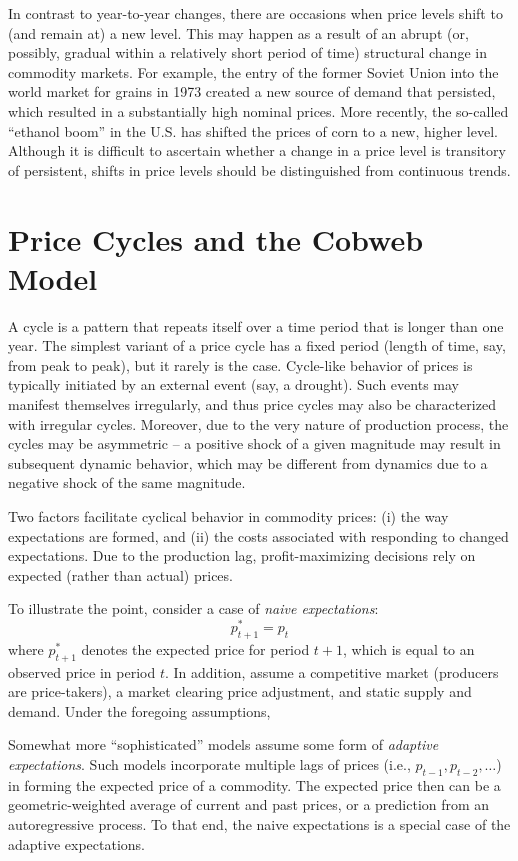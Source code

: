 \documentclass[]{book}
\begin{document}
In contrast to year-to-year changes, there are occasions when price
levels shift to (and remain at) a new level. This may happen as a result
of an abrupt (or, possibly, gradual within a relatively short period of
time) structural change in commodity markets. For example, the entry of
the former Soviet Union into the world market for grains in 1973 created
a new source of demand that persisted, which resulted in a substantially
high nominal prices. More recently, the so-called ``ethanol boom'' in
the U.S. has shifted the prices of corn to a new, higher level. Although
it is difficult to ascertain whether a change in a price level is
transitory of persistent, shifts in price levels should be distinguished
from continuous trends.

\section{Price Cycles and the Cobweb
Model}\label{price-cycles-and-the-cobweb-model}

A cycle is a pattern that repeats itself over a time period that is
longer than one year. The simplest variant of a price cycle has a fixed
period (length of time, say, from peak to peak), but it rarely is the
case. Cycle-like behavior of prices is typically initiated by an
external event (say, a drought). Such events may manifest themselves
irregularly, and thus price cycles may also be characterized with
irregular cycles. Moreover, due to the very nature of production
process, the cycles may be asymmetric -- a positive shock of a given
magnitude may result in subsequent dynamic behavior, which may be
different from dynamics due to a negative shock of the same magnitude.

Two factors facilitate cyclical behavior in commodity prices: (i) the
way expectations are formed, and (ii) the costs associated with
responding to changed expectations. Due to the production lag,
profit-maximizing decisions rely on expected (rather than actual)
prices.

To illustrate the point, consider a case of \emph{naive expectations}:
\[p_{t+1}^{*} = p_{t}\] where \(p_{t+1}^{*}\) denotes the expected price
for period \(t+1\), which is equal to an observed price in period \(t\).
In addition, assume a competitive market (producers are price-takers), a
market clearing price adjustment, and static supply and demand. Under
the foregoing assumptions,

Somewhat more ``sophisticated'' models assume some form of
\emph{adaptive expectations}. Such models incorporate multiple lags of
prices (i.e., \(p_{t-1},p_{t-2},\dots\)) in forming the expected price
of a commodity. The expected price then can be a geometric-weighted
average of current and past prices, or a prediction from an
autoregressive process. To that end, the naive expectations is a special
case of the adaptive expectations.
\end{document}
